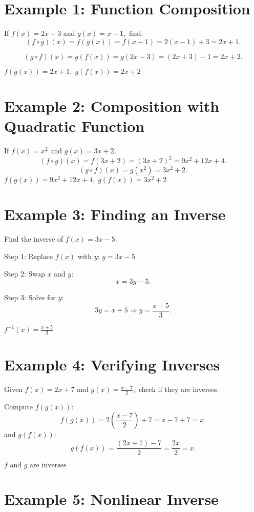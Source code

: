 \documentclass[12pt]{article}
\begin{document}
\section*{Example 1: Function Composition}

If \(f(x) = 2x + 3\) and \(g(x) = x - 1,\) find:
\[
(f \circ g)(x) = f(g(x)) = f(x - 1) = 2(x - 1) + 3 = 2x + 1.
\]

\[
(g \circ f)(x) = g(f(x)) = g(2x + 3) = (2x + 3) - 1 = 2x + 2.
\]

\(\boxed{f(g(x)) = 2x + 1,\; g(f(x)) = 2x + 2}\)

\section*{Example 2: Composition with Quadratic Function}

If \(f(x) = x^2\) and \(g(x) = 3x + 2,\)
\[
(f \circ g)(x) = f(3x + 2) = (3x + 2)^2 = 9x^2 + 12x + 4.
\]
\[
(g \circ f)(x) = g(x^2) = 3x^2 + 2.
\]
\(\boxed{f(g(x)) = 9x^2 + 12x + 4,\; g(f(x)) = 3x^2 + 2}\)

\section*{Example 3: Finding an Inverse}

Find the inverse of \(f(x) = 3x - 5.\)

Step 1: Replace \(f(x)\) with \(y\): \(y = 3x - 5.\)

Step 2: Swap \(x\) and \(y\):
\[
x = 3y - 5.
\]

Step 3: Solve for \(y\):
\[
3y = x + 5 \Rightarrow y = \frac{x + 5}{3}.
\]

\(\boxed{f^{-1}(x) = \frac{x + 5}{3}}\)

\section*{Example 4: Verifying Inverses}

Given \(f(x) = 2x + 7\) and \(g(x) = \frac{x - 7}{2},\)
check if they are inverses.

Compute \(f(g(x))\):
\[
f(g(x)) = 2\left(\frac{x - 7}{2}\right) + 7 = x - 7 + 7 = x.
\]
and \(g(f(x))\):
\[
g(f(x)) = \frac{(2x + 7) - 7}{2} = \frac{2x}{2} = x.
\]

\(\boxed{f \text{ and } g \text{ are inverses}}\)

\section*{Example 5: Nonlinear Inverse}
\end{document}
